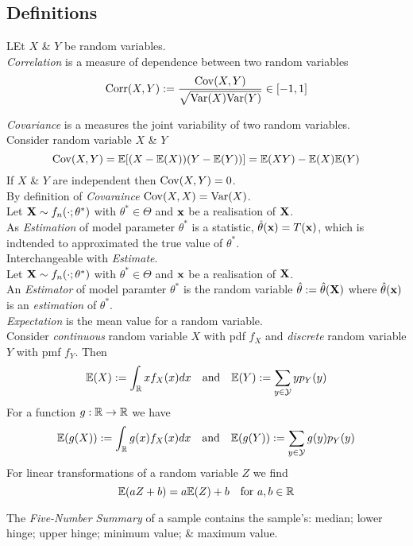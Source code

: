 \documentclass[11pt,a4paper]{article}
\begin{document}
\subsection{Definitions}

LEt $X$ \& $Y$ be random variables.\\
\textit{Correlation} is a measure of dependence between two random variables
$$\text{Corr}(X,Y):=\frac{\mathrm{Cov}(X,Y)}{\sqrt{\mathrm{Var}(X)\mathrm{Var}(Y)}}\in[-1,1]$$

\textit{Covariance} is a measures the joint variability of two random variables.\\
Consider random variable $X$ \& $Y$
$$\mathrm{Cov}(X,Y)=\mathbb{E}[(X-\mathbb{E}(X))(Y-\mathbb{E}(Y))]=\mathbb{E}(XY)-\mathbb{E}(X)\mathbb{E}(Y)$$
If $X$ \& $Y$ are independent then $\mathrm{Cov}(X,Y)=0$.\\
By definition of \textit{Covaraince} $\mathrm{Cov}(X,X)=\mathrm{Var}(X)$.\\

Let $\textbf{X}\sim f_n(\cdot;\theta^*)$ with $\theta^*\in\Theta$ and $\textbf{x}$ be a realisation of $\textbf{X}$.\\
As \textit{Estimation} of model parameter $\theta^*$ is a statistic, $\hat\theta(\textbf{x})=T(\textbf{x})$, which is indtended to approximated the true value of $\theta^*$.\\
\nb Interchangeable with \textit{Estimate}.\\

Let $\textbf{X}\sim f_n(\cdot;\theta^*)$ with $\theta^*\in\Theta$ and $\textbf{x}$ be a realisation of $\textbf{X}$.\\
An \textit{Estimator} of model paramter $\theta^*$ is the random variable $\hat\theta:=\hat\theta(\textbf{X})$ where $\hat\theta(\textbf{x})$ is an \textit{estimation} of $\theta^*$.\\

\textit{Expectation} is the mean value for a random variable.\\
Consider \textit{continuous} random variable $X$ with pdf $f_X$ and \textit{discrete} random variable $Y$ with pmf $f_Y$. Then
$$\mathbb{E}(X):=\int_{\mathbb{R}} xf_X(x)dx\quad\text{and}\quad\mathbb{E}(Y):=\sum_{y\in\mathcal{Y}}yp_Y(y)$$
For a function $g:\mathbb{R}\to\mathbb{R}$ we have
$$\mathbb{E}(g(X)):=\int_{\mathbb{R}} g(x)f_X(x)dx\quad\text{and}\quad\mathbb{E}(g(Y)):=\sum_{y\in\mathcal{Y}}g(y)p_Y(y)$$
For linear transformations of a random variable $Z$ we find
$$\mathbb{E}(aZ+b)=a\mathbb{E}(Z)+b\quad\text{for }a,b\in\mathbb{R}$$

The \textit{Five-Number Summary} of a sample contains the sample's: median; lower hinge; upper hinge; minimum value; \& maximum value.\\
\end{document}
